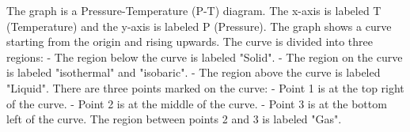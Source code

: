The graph is a Pressure-Temperature (P-T) diagram. The x-axis is labeled T (Temperature) and the y-axis is labeled P (Pressure). The graph shows a curve starting from the origin and rising upwards. The curve is divided into three regions:
- The region below the curve is labeled "Solid".
- The region on the curve is labeled "isothermal" and "isobaric".
- The region above the curve is labeled "Liquid".
There are three points marked on the curve:
- Point 1 is at the top right of the curve.
- Point 2 is at the middle of the curve.
- Point 3 is at the bottom left of the curve.
The region between points 2 and 3 is labeled "Gas".